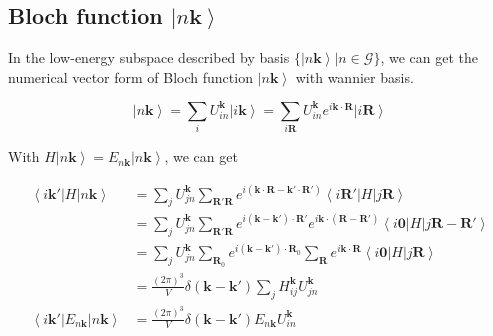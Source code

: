 \documentclass{report}
\begin{document}
\subsection{Bloch function $\left| n\boldsymbol{k} \right\rangle$}

In the low-energy subspace described by basis $\{\left| n\boldsymbol{k} \right\rangle | n \in \mathcal{G}\}$, 
we can get the numerical vector form of Bloch function $\left| n\boldsymbol{k} \right\rangle$ with wannier basis.

\begin{equation}
  \left| n \boldsymbol{k} \right\rangle 
    = \sum_{i} U_{in}^{\boldsymbol{k}} \left| i\boldsymbol{k} \right\rangle 
    = \sum_{i\boldsymbol{R}} U_{in}^{\boldsymbol{k}} e^{i\boldsymbol{k} \cdot \boldsymbol{R}} \left| i\boldsymbol{R} \right\rangle 
\end{equation}

\noindent
With $\hat{H} \left| n \boldsymbol{k} \right\rangle = E_{n \boldsymbol{k}} \left| n \boldsymbol{k} \right\rangle$, we can get

\begin{equation}
  \begin{aligned}
    \left\langle i \boldsymbol{k}' \right| H \left| n \boldsymbol{k} \right\rangle 
      &= \sum_{j} U_{jn}^{\boldsymbol{k}} \sum_{\boldsymbol{R}'\boldsymbol{R}} 
        e^{i\left( \boldsymbol{k} \cdot \boldsymbol{R} - \boldsymbol{k}' \cdot \boldsymbol{R}' \right)} 
        \left\langle i \boldsymbol{R}' \right| H \left| j \boldsymbol{R} \right\rangle \\
      &= \sum_{j} U_{jn}^{\boldsymbol{k}} \sum_{\boldsymbol{R}'\boldsymbol{R}} 
        e^{i\left( \boldsymbol{k} - \boldsymbol{k}' \right) \cdot \boldsymbol{R}'} 
        e^{i\boldsymbol{k} \cdot \left( \boldsymbol{R} - \boldsymbol{R}' \right)} 
        \left\langle i \boldsymbol{0} \right| H \left| j \boldsymbol{R} - \boldsymbol{R}' \right\rangle \\
      &= \sum_{j} U_{jn}^{\boldsymbol{k}} \sum_{\boldsymbol{R}_0} e^{i\left( \boldsymbol{k} - \boldsymbol{k}' \right) \cdot \boldsymbol{R}_0} 
        \sum_{\boldsymbol{R}} e^{i\boldsymbol{k} \cdot \boldsymbol{R}} 
        \left\langle i \boldsymbol{0} \right| H \left| j \boldsymbol{R} \right\rangle \\
      &= \frac{(2\pi)^3}{V} \delta(\boldsymbol{k}-\boldsymbol{k}') \sum_{j} H_{ij}^{\boldsymbol{k}} U_{jn}^{\boldsymbol{k}} \\
    \left\langle i \boldsymbol{k}' \right| E_{n\boldsymbol{k}} \left| n \boldsymbol{k} \right\rangle 
      &= \frac{(2\pi)^3}{V} \delta(\boldsymbol{k}-\boldsymbol{k}') E_{n\boldsymbol{k}} U_{in}^{\boldsymbol{k}} 
  \end{aligned}
\end{equation}
\end{document}
